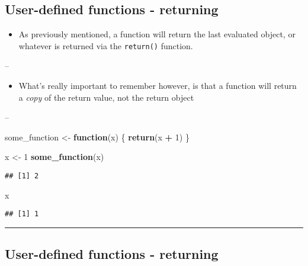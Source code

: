 \documentclass[]{article}
\newenvironment{Shaded}{\begin{snugshade}}{\end{snugshade}}
\newcommand{\ControlFlowTok}[1]{\textcolor[rgb]{0.13,0.29,0.53}{\textbf{#1}}}
\newcommand{\DecValTok}[1]{\textcolor[rgb]{0.00,0.00,0.81}{#1}}
\newcommand{\KeywordTok}[1]{\textcolor[rgb]{0.13,0.29,0.53}{\textbf{#1}}}
\newcommand{\NormalTok}[1]{#1}
\newcommand{\OperatorTok}[1]{\textcolor[rgb]{0.81,0.36,0.00}{\textbf{#1}}}
\newcommand{\StringTok}[1]{\textcolor[rgb]{0.31,0.60,0.02}{#1}}
\providecommand{\tightlist}{%
  \setlength{\itemsep}{0pt}\setlength{\parskip}{0pt}}
\begin{document}
\hypertarget{user-defined-functions---returning}{%
\subsection{User-defined functions -
returning}\label{user-defined-functions---returning}}

\begin{itemize}
\tightlist
\item
  As previously mentioned, a function will return the last evaluated
  object, or whatever is returned via the \texttt{return()} function.
\end{itemize}

--

\begin{itemize}
\tightlist
\item
  What's really important to remember however, is that a function will
  return a \emph{copy} of the return value, not the return object
\end{itemize}

--

\begin{Shaded}
\begin{Highlighting}[]
\NormalTok{some_function <-}\StringTok{ }\ControlFlowTok{function}\NormalTok{(x) \{}
  \KeywordTok{return}\NormalTok{(x }\OperatorTok{+}\StringTok{ }\DecValTok{1}\NormalTok{)}
\NormalTok{\}}

\NormalTok{x <-}\StringTok{ }\DecValTok{1}
\KeywordTok{some_function}\NormalTok{(x)}
\end{Highlighting}
\end{Shaded}

\begin{verbatim}
## [1] 2
\end{verbatim}

\begin{Shaded}
\begin{Highlighting}[]
\NormalTok{x}
\end{Highlighting}
\end{Shaded}

\begin{verbatim}
## [1] 1
\end{verbatim}

\begin{center}\rule{0.5\linewidth}{\linethickness}\end{center}

\hypertarget{user-defined-functions---returning-1}{%
\subsection{User-defined functions -
returning}\label{user-defined-functions---returning-1}}
\end{document}
